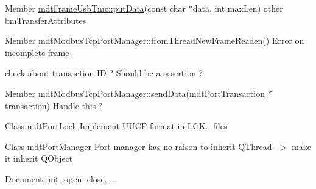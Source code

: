 \label{todo__todo000079}
\hypertarget{todo__todo000079}{}
 
\begin{DoxyDescription}
\item[Member \hyperlink{classmdt_frame_usb_tmc_a06d2743a113bd2b4cf2ee44014ecd710}{mdtFrameUsbTmc::putData}(const char $\ast$data, int maxLen) ]other bmTransferAttributes 
\end{DoxyDescription}

\label{todo__todo000035}
\hypertarget{todo__todo000035}{}
 
\begin{DoxyDescription}
\item[Member \hyperlink{classmdt_modbus_tcp_port_manager_ad941ea607f00db54aa6deb2866a539e9}{mdtModbusTcpPortManager::fromThreadNewFrameReaden}() ]Error on incomplete frame 

check about transaction ID ? Should be a assertion ? 
\end{DoxyDescription}

\label{todo__todo000034}
\hypertarget{todo__todo000034}{}
 
\begin{DoxyDescription}
\item[Member \hyperlink{classmdt_modbus_tcp_port_manager_a208a3b2522795974836fd8aef406725a}{mdtModbusTcpPortManager::sendData}(\hyperlink{classmdt_port_transaction}{mdtPortTransaction} $\ast$transaction) ]Handle this ? 
\end{DoxyDescription}

\label{todo__todo000028}
\hypertarget{todo__todo000028}{}
 
\begin{DoxyDescription}
\item[Class \hyperlink{classmdt_port_lock}{mdtPortLock} ]Implement UUCP format in LCK.. files 
\end{DoxyDescription}

\label{todo__todo000040}
\hypertarget{todo__todo000040}{}
 
\begin{DoxyDescription}
\item[Class \hyperlink{classmdt_port_manager}{mdtPortManager} ]Port manager has no raison to inherit QThread -\/$>$ make it inherit QObject 

Document init, open, close, ...
\end{DoxyDescription}

\label{todo__todo000039}
\hypertarget{todo__todo000039}{}
 
